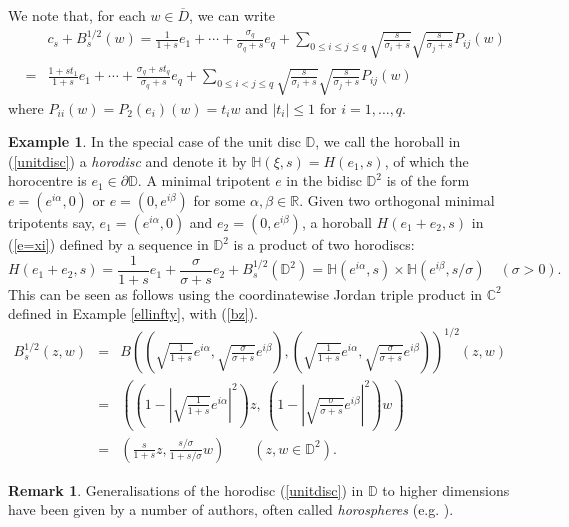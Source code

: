 \documentclass[12pt, twoside]{article}
\theoremstyle{definition}
\newtheorem{example}[theorem]{Example}
\newtheorem*{xrem}{Remark}
\numberwithin{equation}{section}
\begin{document}
 We note that, for each $w\in \overline D$, we can write
 \begin{eqnarray}\label{419}
&& c_s + B_s^{1/2}(w) =\frac{1}{1+s} e_1 + \cdots +  \frac{\sigma_q}{\sigma_q +s}e_q + \sum_{0\leq i\leq j \leq q}
\sqrt{\frac{s}{\sigma_i +s}}\sqrt{\frac{s}{\sigma_j +s}}P_{ij}(w)\nonumber\\
 &=&\frac{1+st_1}{1+s} e_1 + \cdots +  \frac{\sigma_q+st_q}{\sigma_q +s}e_q + \sum_{0\leq i<j \leq q}
\sqrt{\frac{s}{\sigma_i +s}}\sqrt{\frac{s}{\sigma_j +s}}P_{ij}(w)
\end{eqnarray}
 where $P_{ii}(w) = P_2(e_i)(w) = t_i w$  and $|t_i|\leq 1$ for $i= 1, \ldots, q$.

\begin{example}\label{2disc}
In the special case of the unit disc $\mathbb{D}$, we call the horoball in (\ref{unitdisc}) a {\it horodisc} and denote
it by $\mathbb{H}(\xi,s)=H(e_1,s)$,
of which the horocentre is $e_1\in \partial \mathbb{D}$.
A minimal tripotent $e$ in the bidisc $\mathbb{D}^2$ is of the form $e=(e^{i\alpha},0)$ or
$e=(0, e^{i\beta})$ for some $\alpha, \beta \in \mathbb{R}$. Given two orthogonal minimal tripotents say,
$e_1=(e^{i\alpha},0)$ and $e_2=(0, e^{i\beta})$, a horoball $H(e_1+e_2, s)$
in (\ref{e=xi}) defined by a sequence in $\mathbb{D}^2$ is a product of two horodiscs:
$$H(e_1+e_2, s) = \frac{1}{1+s}e_1 + \frac{\sigma}{\sigma +s}e_2 + B_s^{1/2}(\mathbb{D}^2)=
\mathbb{H}(e^{i\alpha},s) \times \mathbb{H}(e^{i\beta}, s/\sigma) \quad (\sigma >0).$$
 This can be seen as follows using the coordinatewise Jordan triple
product in $\mathbb{C}^2$ defined in Example \ref{ellinfty}, with  (\ref{bz}).
\begin{eqnarray*}
B_s^{1/2}(z,w) &=& B\left(\left (\sqrt{\frac{1}{1+s}}e^{i\alpha} , \sqrt{\frac{\sigma}{\sigma+s}} e^{i\beta}\right),
\left(\sqrt{\frac{1}{1+s}}e^{i\alpha} , \sqrt{\frac{\sigma }{\sigma+s}}e^{i\beta}\right)\right)^{1/2}(z,w)\\
 &=& \left(\left(1-\left|\sqrt{\frac{1}{1+s}} e^{i\alpha}\right|^2\right) z,\,
 \left(1-\left|\sqrt{\frac{\sigma}{\sigma+s}} e^{i\beta}\right|^2\right)w\right)\\
& =&\left( \frac{s}{1+s} z,  \frac{s/\sigma}{1+s/\sigma}w\right) \qquad (z,w\in \mathbb{D}^2).
\end{eqnarray*}
\end{example}

\begin{xrem} Generalisations of the horodisc (\ref{unitdisc}) in $\mathbb{D}$
 to higher dimensions have been given by a number of authors, often called {\it horospheres}
(e.g. \cite{aba,ab,yang}).
\end{xrem}
\end{document}
